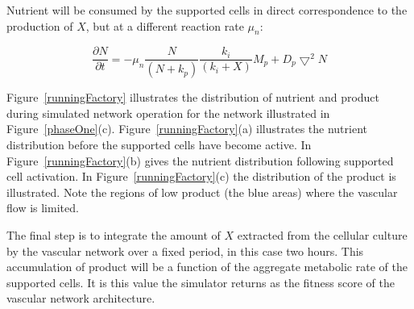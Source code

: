 %

Nutrient will be consumed by the supported cells in direct correspondence to the production of $X$, but at a different reaction rate $\mu_n$:

\begin{equation}
\frac{\partial N}{\partial t}=-\mu _{n}  \frac{N}{(N+k_p)} \frac{k_i}{(k_i+X)} M_p + D_{p}\bigtriangledown^{2} N
\label{nutrientConsumption}
\end{equation}

 Figure~\ref{runningFactory} illustrates the distribution of nutrient and product during simulated network operation for the network illustrated in Figure~\ref{phaseOne}(c).
 Figure~\ref{runningFactory}(a) illustrates the nutrient distribution before the supported cells have become active. In Figure~\ref{runningFactory}(b) gives the nutrient distribution following supported cell activation. In Figure~\ref{runningFactory}(c) the distribution of the product is illustrated. Note the regions of low product (the blue areas) where the vascular flow is limited.

 The final step is to integrate the amount of $X$ extracted from the cellular culture by the vascular network over a fixed period, in this case two hours. This accumulation of product will be a function of the aggregate metabolic rate of the supported cells. It is this value the simulator returns as the fitness score of the vascular network architecture.




